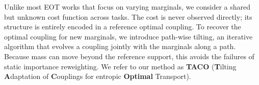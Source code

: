 \documentclass[11pt]{article}
\theoremstyle{definition}
\numberwithin{equation}{section}%
\begin{document}


Unlike most EOT works that focus on varying marginals, we consider a shared but unknown cost function across tasks.
The cost is never observed directly; its structure is entirely encoded in a reference optimal coupling.
To recover the optimal coupling for new marginals, we introduce path-wise tilting, an iterative algorithm that evolves a coupling jointly with the marginals along a path.
Because mass can move beyond the reference support, this avoids the failures of static importance reweighting. We refer to our method as \textbf{TACO} (\textbf{T}ilting  \textbf{A}daptation of \textbf{C}ouplings for entropic \textbf{Optimal} Transport).
\end{document}
